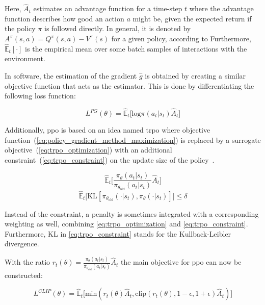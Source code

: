\documentclass[draft,final]{vutinfth} %
\newcommand{\pautoref}[1]{(\autoref{#1})}
\begin{document}
    Here, $\hat{A}_t$ estimates an advantage function for a time-step $t$ where the advantage function describes
    how good an action $a$ might be, given the expected return if the policy $\pi$ is followed directly.
    In general, it is denoted by $A^\pi(s,a)=Q^\pi(s,a)-V^\pi(s)$ for a given policy, according to \citeauthor{francois-lavet_introduction_2018}
    Furthermore, $\hat{\mathbb{E}}_t[\cdot]$ is the empirical mean over some batch samples of interactions with the environment.

    In software, the estimation of the gradient $\hat{g}$ is obtained by creating a similar objective function that acts as the estimator.
    This is done by differentiating the following loss function:

    \begin{equation}
        L^{PG}(\theta)=\hat{\mathbb{E}}_t\bigg [\text{log}\pi(a_t|s_t)\hat{A}_t\bigg]\label{eq:no_clip_no_penalty}
    \end{equation}

    Additionally, \gls{ppo} is based on an idea named \gls{trpo} where objective function~\pautoref{eq:policy_gradient_method_maximization} is replaced by a surrogate objective~\pautoref{eq:trpo_optimization} with an additional constraint~\pautoref{eq:trpo_constraint} on the update size of the policy~\citep{schulman_trust_2015}.

    \begin{equation}
        \hat{\mathbb{E}}_t\bigg [\frac{\pi_\theta(a_t|s_t)}{\pi_{\theta_{\text{old}}}(a_t|s_t)}\hat{A}_t\bigg]\label{eq:trpo_optimization}
    \end{equation}
    \begin{equation}
        \hat{\mathbb{E}}_t\bigg [\text{KL}[\pi_{\theta_{\text{old}}}(\cdot|s_t),\pi_{\theta}(\cdot|s_t)]\bigg]\leq\delta\label{eq:trpo_constraint}
    \end{equation}

    Instead of the constraint, a penalty is sometimes integrated with a corresponding weighting as well, combining \autoref{eq:trpo_optimization} and \ref{eq:trpo_constraint}.
    Furthermore, KL in \autoref{eq:trpo_constraint} stands for the Kullback-Leibler divergence.

    With the ratio $r_t(\theta)=\frac{\pi_\theta(a_t|s_t)}{\pi_{\theta_{\text{old}}}(a_t|s_t)}\hat{A}_t$ the main objective for \gls{ppo} can now be constructed:

    \begin{equation}
        L^{CLIP}(\theta)=\hat{\mathbb{E}}_t\bigg[\text{min}(r_t(\theta)\hat{A}_t,\text{clip}(r_t(\theta),1-\epsilon,1+\epsilon)\hat{A}_t)\bigg]\label{eq:ppo_clip}
    \end{equation}
\end{document}
